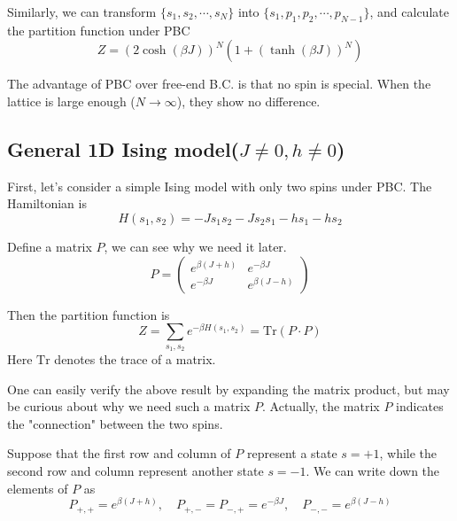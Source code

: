 \documentclass[11pt]{article}
\begin{document}
	Similarly, we can transform $\{s_1, s_2, \cdots, s_N\}$ into $\{s_1, p_1, p_2, \cdots, p_{N-1}\}$, 
	and calculate the partition function under PBC
	\begin{equation} \label{eq:PartitionFunction1DNoFieldPeriodic}
		Z = (2\cosh(\beta J))^N(1 + (\tanh(\beta J))^N)
	\end{equation}

	The advantage of PBC over free-end B.C. is that no spin is special.
	When the lattice is large enough ($N \to \infty$), they show no difference.

	\subsection{General 1D Ising model($J\neq0, h\neq0$)}

	First, let's consider a simple Ising model with only two spins under PBC.
	The Hamiltonian is
	\begin{equation} \label{eq:Hamiltonian1DGeneral2Spins}
		H(s_1, s_2) = -J s_1 s_2 - J s_2 s_1 - hs_1 - hs_2
	\end{equation}

	Define a matrix $P$, we can see why we need it later.
	\begin{equation} \label{eq:MatrixP}
		P = \begin{pmatrix}
			e^{\beta(J+h)} & e^{-\beta J} \\
			e^{-\beta J} & e^{\beta(J-h)}
		\end{pmatrix}
	\end{equation}

	Then the partition function is
	\begin{equation} \label{eq:PartitionFunction1DGeneral2Spins}
		Z = \sum_{s_1, s_2} e^{-\beta H(s_1, s_2)} = \mathrm{Tr}(P \cdot P)
	\end{equation}
	Here $\mathrm{Tr}$ denotes the trace of a matrix.

	One can easily verify the above result by expanding the matrix product, 
	but may be curious about why we need such a matrix $P$.
	Actually, the matrix $P$ indicates the "connection" between the two spins.

	Suppose that the first row and column of $P$ represent a state $s = +1$, 
	while the second row and column represent another state $s = -1$.
	We can write down the elements of $P$ as
	\begin{equation} \label{eq:MatrixPElements}
		P_{+,+} = e^{\beta(J+h)}, \quad P_{+,-} = P_{-,+} = e^{-\beta J}, \quad P_{-,-} = e^{\beta(J-h)}
	\end{equation}
\end{document}

